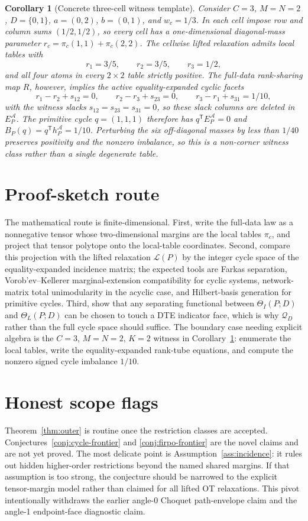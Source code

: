 \documentclass[11pt]{article}
\newcommand{\transpose}{\mathsf{T}}
\theoremstyle{definition}
\theoremstyle{plain}
\newtheorem{corollary}{Corollary}
\theoremstyle{remark}
\begin{document}
\begin{corollary}[Concrete three-cell witness template]\label{cor:witness}
Consider \(C=3\), \(M=N=2\), \(D=\{0,1\}\), \(a=(0,2)\), \(b=(0,1)\), and
\(w_c=1/3\).  In each cell impose row and column sums \((1/2,1/2)\), so every
cell has a one-dimensional diagonal-mass parameter
\(r_c=\pi_c(1,1)+\pi_c(2,2)\).  The cellwise lifted relaxation admits local
tables with
\[
r_1=3/5,\qquad r_2=3/5,\qquad r_3=1/2,
\]
and all four atoms in every \(2\times2\) table strictly positive.  The
full-data rank-sharing map \(R\), however, implies the active equality-expanded
cyclic facets
\[
r_1-r_2+s_{12}=0,\qquad
r_2-r_3+s_{23}=0,\qquad
r_3-r_1+s_{31}=1/10,
\]
with the witness slacks \(s_{12}=s_{23}=s_{31}=0\), so these slack columns are
deleted in \(E_P^{\mathcal A}\).  The primitive cycle
\(q=(1,1,1)\) therefore has \(q^\transpose E_P^{\mathcal A}=0\) and
\(B_P(q)=q^\transpose h_P^{\mathcal A}=1/10\).  Perturbing the six off-diagonal masses by
less than \(1/40\) preserves positivity and the nonzero imbalance, so this is a
non-corner witness class rather than a single degenerate table.
\end{corollary}

\section{Proof-sketch route}
The mathematical route is finite-dimensional.  First, write the full-data law as
a nonnegative tensor whose two-dimensional margins are the local tables
\(\pi_c\), and project that tensor polytope onto the local-table coordinates.
Second, compare this projection with the lifted relaxation \(\mathcal L(P)\) by
the integer cycle space of the equality-expanded incidence matrix; the expected
tools are Farkas separation, Vorob'ev--Kellerer marginal-extension
compatibility for cyclic systems, network-matrix total unimodularity in the
acyclic case, and Hilbert-basis generation for primitive cycles.  Third, show that any
separating functional between \(\Theta_I(P;D)\) and \(\Theta_L(P;D)\) can be
chosen to touch a DTE indicator face, which is why \(\mathcal Q_D\) rather than
the full cycle space should suffice.  The boundary case needing explicit algebra
is the \(C=3\), \(M=N=2\), \(K=2\) witness in
Corollary~\ref{cor:witness}: enumerate the local tables, write the
equality-expanded rank-tube equations, and compute the nonzero signed cycle
imbalance \(1/10\).

\section{Honest scope flags}
Theorem~\ref{thm:outer} is routine once the restriction classes are accepted.
Conjectures~\ref{conj:cycle-frontier} and \ref{conj:firpo-frontier} are the novel
claims and are not yet proved.  The most delicate point is Assumption~\ref{ass:incidence}:
it rules out hidden higher-order restrictions beyond the named shared margins.
If that assumption is too strong, the conjecture should be narrowed to the
explicit tensor-margin model rather than claimed for all lifted OT relaxations.
This pivot intentionally withdraws the earlier angle-0 Choquet path-envelope
claim and the angle-1 endpoint-face diagnostic claim.
\end{document}
